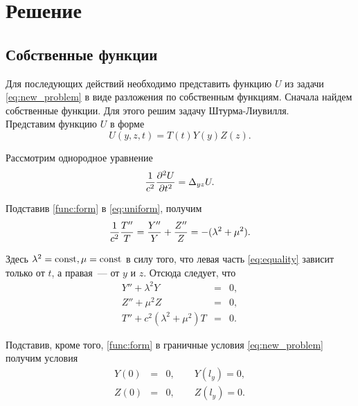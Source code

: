 \chapter{Решение}
\section{Собственные функции}
Для последующих действий необходимо представить функцию $U$ из задачи \eqref{eq:new_problem} в виде разложения по собственным функциям. Сначала найдем собственные функции. Для этого решим задачу Штурма-Лиувилля.\\
Представим функцию $U$ в форме  
\begin{equation}
  \label{func:form}
  U(y, z, t) = T(t)Y(y)Z(z).
\end{equation}

Рассмотрим однородное уравнение
\begin{equation}
  \label{eq:uniform}
  \frac{1}{c^2} \frac{\partial^2 U}{\partial t^2} = \Delta_{yz} U.\\
\end{equation}

Подставив \eqref{func:form} в \eqref{eq:uniform}, получим
\begin{equation}
  \label{eq:equality}
  \frac{1}{c^2}\frac{T''}{T} = \frac{Y''}{Y} + \frac{Z''}{Z} = -(\lambda^2 + \mu^2).\\
\end{equation}

Здесь $\lambda^2 = \mathrm{const}, \mu = \mathrm{const}$ в силу того, что левая часть \eqref{eq:equality} зависит только от $t$,
а правая~--- от $y$ и $z$. Отсюда следует, что
\begin{equation}
  \label{eq:shturm-liuville}
  \left.
  \begin{array}{rcl}
    Y'' + \lambda^2 Y &=& 0,\\
    Z'' + \mu^2 Z &=& 0,\\
    T'' + c^2(\lambda^2 + \mu^2)T &=& 0.
  \end{array}
  \right.
\end{equation}

Подставив, кроме того, \eqref{func:form} в граничные условия \eqref{eq:new_problem} получим условия
\begin{equation}
  \left.
  \label{eq:conditions}
  \begin{array}{rcl}
    Y(0) &=& 0,\qquad Y(l_y) = 0,\\
    Z(0) &=& 0,\qquad Z(l_y) = 0.
  \end{array}
  \right.
\end{equation}

